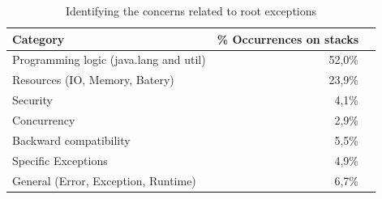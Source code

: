 \documentclass[conference]{IEEEtran}
\begin{document}
 



\begin{table}
  \centering
  \begin{tabular}{lrr}
    \hline
    \bfseries{Category} &  \bfseries{\% Occurrences on stacks} \\
    \hline
      Programming logic (java.lang and util) &  52,0\%\\ 
      Resources (IO, Memory, Batery)       &   23,9\% \\ 
      Security                               &  4,1\%\\  
      Concurrency                            &  2,9\% \\ 
      Backward compatibility                 & 5,5\% \\ 
      Specific Exceptions               &  4,9\%\\ 
      General (Error, Exception, Runtime)    &  6,7\%\\
  \end{tabular}
  \caption{Identifying the concerns related to root exceptions}
  \label{tab:tophundrend}
\end{table}
\end{document}
